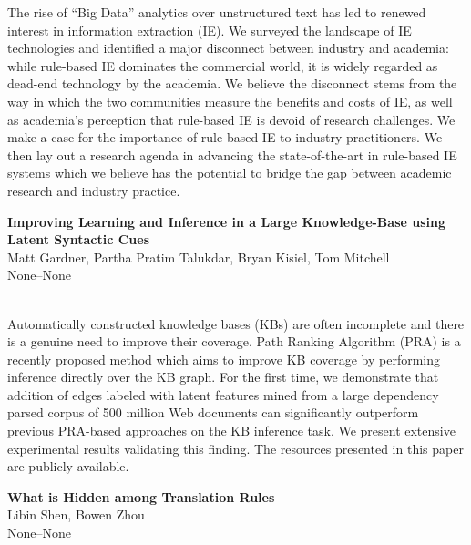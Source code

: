 \documentclass[twoside,makeidx]{book}
\renewcommand{\normalsize}{\fontsize{8}{9}\selectfont}
\renewcommand{\small}{\fontsize{7}{8}\selectfont}
\begin{document}
\nopagebreak%
\noindent%
{\small The rise of ``Big Data'' analytics over unstructured text has led to renewed interest in information extraction (IE). We surveyed the landscape of IE technologies and identified a major disconnect between industry and academia: while rule-based IE dominates the commercial world, it is widely regarded as dead-end technology by the academia. We believe the disconnect stems from the way in which the two communities measure the benefits and costs of IE, as well as academia's perception that rule-based IE is devoid of research challenges. We make a case for the importance of rule-based IE to industry practitioners. We then lay out a research agenda in advancing the state-of-the-art in rule-based IE systems which we believe has the potential to bridge the gap between academic research and industry practice.}
\par\vspace{2em}\noindent%
\begin{minipage}{\linewidth}%
\begin{center}
\textbf{\normalsize Improving Learning and Inference in a Large Knowledge-Base using Latent Syntactic Cues}\\
\normalsize  Matt Gardner,  Partha Pratim Talukdar,  Bryan Kisiel,  Tom Mitchell\\
{\small None--None}\\
\end{center}
\end{minipage}\\[0.5em]
\nopagebreak%
\noindent%
{\small Automatically constructed knowledge bases (KBs) are often incomplete and there is a genuine need to improve their coverage. Path Ranking Algorithm (PRA) is a recently proposed method which aims to improve KB coverage by performing inference directly over the KB graph. For the first time, we demonstrate that addition of edges labeled with latent features mined from a large dependency parsed corpus of 500 million Web documents can significantly outperform previous PRA-based approaches on the KB inference task. We present extensive experimental results validating this finding. The resources presented in this paper are publicly available.}
\par\vspace{2em}\noindent%
\begin{minipage}{\linewidth}%
\begin{center}
\textbf{\normalsize What is Hidden among Translation Rules}\\
\normalsize  Libin Shen,  Bowen Zhou\\
{\small None--None}\\
\end{center}
\end{minipage}\\[0.5em]
\end{document}
